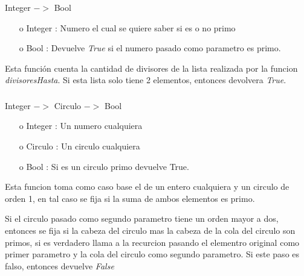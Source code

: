 \documentclass[10pt,journal]{IEEEtran}
\begin{document}
\subsubsection{\color{Red}{esPrimo}}
\begin{description}[style=nextline]
        \item[\color{Green}{Signatura}] Integer $->$ Bool
        
        \begin{itemize} 
        \item [o]  Integer : Numero el cual se quiere saber si es o no primo
        \item [o] Bool : Devuelve \textit{True} si el numero pasado como parametro es primo.
        \end{itemize}        
        
        \item[\color{Green}{Descripción}] Esta función cuenta la cantidad de divisores de la lista realizada por la funcion \textit{divisoresHasta}. Si esta lista solo tiene 2 elementos, entonces devolvera \textit{True}.  
\end{description}


\subsubsection{\color{Red}{circuloPrimoAux}}
\begin{description}[style=nextline]
        \item[\color{Green}{Signatura}] Integer $->$ Circulo $->$ Bool
        
        \begin{itemize} 
        \item [o] Integer : Un numero cualquiera
        \item [o] Circulo : Un circulo cualquiera
        \item [o] Bool : Si es un circulo primo devuelve True.
        \end{itemize}        
        
        \item[\color{Green}{Descripción}]  Esta funcion toma como caso base el de un entero cualquiera y un circulo de orden 1, en tal caso se fija si la suma de ambos elementos es primo. 

Si el circulo pasado como segundo parametro tiene un orden mayor a dos, entonces  se fija si la cabeza del circulo mas la cabeza de la cola del circulo son primos, si es verdadero llama a la recurcion pasando el elementro original como primer parametro y la cola del circulo como segundo parametro. Si este paso es falso, entonces devuelve \textit{False}
\end{description}
\end{document}
